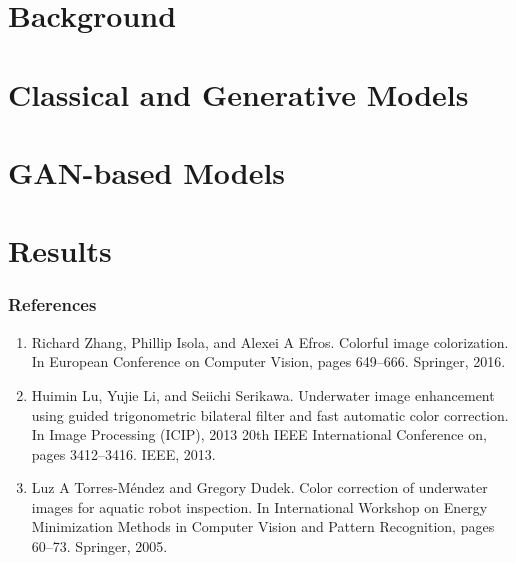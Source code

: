 \documentclass{beamer}
\begin{document}
\section*{Background}

\section*{Classical and Generative Models}

\section*{GAN-based Models}

\section*{Results}





\begin{frame}
\frametitle{\textbf{References}}
\footnotesize
\begin{enumerate}
\item Richard Zhang, Phillip Isola, and Alexei A Efros. Colorful image colorization. In European Conference on Computer Vision,
pages 649–666. Springer, 2016.
\item Huimin Lu, Yujie Li, and Seiichi Serikawa. Underwater image enhancement using guided trigonometric bilateral filter and fast
automatic color correction. In Image Processing (ICIP), 2013 20th IEEE International Conference on, pages 3412–3416. IEEE, 2013.
\item Luz A Torres-Méndez and Gregory Dudek. Color correction of underwater images for aquatic robot inspection. In International
Workshop on Energy Minimization Methods in Computer Vision and Pattern Recognition, pages 60–73. Springer, 2005.



\end{enumerate}
\end{frame}
\end{document}
